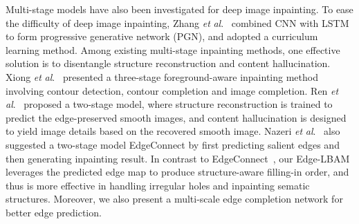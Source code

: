 \documentclass[10pt,journal,compsoc]{IEEEtran}
\newcommand{\etal}{\textit{et} \textit{al}.}
\begin{document}
Multi-stage models have also been investigated for deep image inpainting.
%
To ease the difficulty of deep image inpainting, Zhang \etal~\cite{zhang2018mm} combined CNN with LSTM to form progressive generative network (PGN), and adopted a curriculum learning method.
%
Among existing multi-stage inpainting methods, one effective solution is to disentangle structure reconstruction and content hallucination.
%
Xiong \etal~\cite{Xiong_2019_CVPR} presented a three-stage foreground-aware inpainting method involving contour detection, contour completion and image completion.
%
Ren \etal~\cite{ren2019structureflow} proposed a two-stage model, where structure reconstruction is trained to predict the edge-preserved smooth images, and content hallucination is designed to yield image details based on the recovered smooth image.
%
Nazeri \etal~\cite{nazeri2019edgeconnect} also suggested a two-stage model EdgeConnect by first predicting salient edges and then generating inpainting result.
%
In contrast to EdgeConnect~\cite{nazeri2019edgeconnect}, our Edge-LBAM leverages the predicted edge map to produce structure-aware filling-in order, and thus is more effective in handling irregular holes and inpainting sematic structures.
%
Moreover, we also present a multi-scale edge completion network for better edge prediction.
\end{document}
